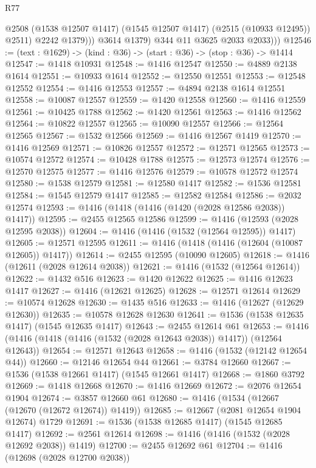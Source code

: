 \begin{lexlean}{R77}
\begin{coremodule}
{{                  @2508 (@1538 @12507 @1417) (@1545 @12507 @1417) (@2515 (@10933 @12495)) @2511)
                  @2242
                  @1379)))
            @3614
            @1379)
          @344
          @11
          @3625
          @2033
          @2033)))
@12546 := (text : @1629) -> (kind : @36) -> (start : @36) -> (stop : @36) -> @1414
@12547 := @1418 @10931
@12548 := @1416 @12547
@12550 := @4889 @2138 @1614
@12551 := @10933 @1614
@12552 := @12550 @12551
@12553 := @12548 @12552
@12554 := @1416 @12553
@12557 := @4894 @2138 @1614 @12551
@12558 := @10087 @12557
@12559 := @1420 @12558
@12560 := @1416 @12559
@12561 := @10425 @1788
@12562 := @1420 @12561
@12563 := @1416 @12562
@12564 := @10822 @12557
@12565 := @10090 @12557
@12566 := @12564 @12565
@12567 := @1532 @12566
@12569 := @1416 @12567 @1419
@12570 := @1416 @12569
@12571 := @10826 @12557
@12572 := @12571 @12565
@12573 := @10574 @12572
@12574 := @10428 @1788
@12575 := @12573 @12574
@12576 := @12570 @12575
@12577 := @1416 @12576
@12579 := @10578 @12572 @12574
@12580 := @1538 @12579
@12581 := @12580 @1417
@12582 := @1536 @12581
@12584 := @1545 @12579 @1417
@12585 := @12582 @12584
@12586 := @2032 @12574
@12593 := @1416 (@1418 (@1416 (@1420 (@2028 @12586 @2038)) @1417))
@12595 := @2455 @12565 @12586
@12599 := @1416 (@12593 (@2028 @12595 @2038))
@12604 := @1416 (@1416 (@1532 (@12564 @12595)) @1417)
@12605 := @12571 @12595
@12611 := @1416 (@1418 (@1416 (@12604 (@10087 @12605)) @1417))
@12614 := @2455 @12595 (@10090 @12605)
@12618 := @1416 (@12611 (@2028 @12614 @2038))
@12621 := @1416 (@1532 (@12564 @12614))
@12622 := @1432 @516
@12623 := @1420 @12622
@12625 := @1416 @12623 @1417
@12627 := @1416 (@12621 @12625)
@12628 := @12571 @12614
@12629 := @10574 @12628
@12630 := @1435 @516
@12633 := @1416 (@12627 (@12629 @12630))
@12635 := @10578 @12628 @12630
@12641 := @1536 (@1538 @12635 @1417) (@1545 @12635 @1417)
@12643 := @2455 @12614 @61
@12653 := @1416 (@1416 (@1418 (@1416 (@1532 (@2028 @12643 @2038)) @1417)) (@12564 @12643))
@12654 := @12571 @12643
@12658 := @1416 (@1532 (@12142 @12654 @44))
@12660 := @12146 @12654 @44
@12661 := @3784 @12660
@12667 := @1536 (@1538 @12661 @1417) (@1545 @12661 @1417)
@12668 := @1860 @3792
@12669 := @1418 @12668
@12670 := @1416 @12669
@12672 := @2076 @12654 @1904
@12674 := @3857 @12660 @61
@12680 := @1416 (@1534 (@12667 (@12670 (@12672 @12674)) @1419))
@12685 := @12667 (@2081 @12654 @1904 @12674) @1729
@12691 := @1536 (@1538 @12685 @1417) (@1545 @12685 @1417)
@12692 := @2561 @12614
@12698 := @1416 (@1416 (@1532 (@2028 @12692 @2038)) @1419)
@12700 := @2455 @12692 @61
@12704 := @1416 (@12698 (@2028 @12700 @2038))
}}
\end{coremodule}
\end{lexlean}
